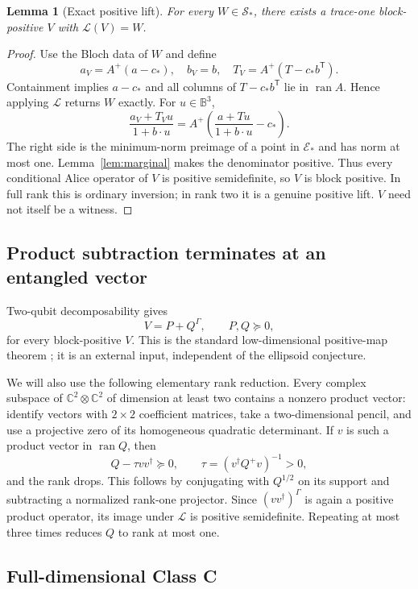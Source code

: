 \documentclass[11pt,a4paper]{article}
\newtheorem{lemma}[theorem]{Lemma}
\theoremstyle{definition}\newtheorem{definition}[theorem]{Definition}
\newcommand{\ran}{\operatorname{ran}}
\newcommand{\B}{\mathbb B^3}
\newcommand{\E}{\mathcal E}
\newcommand{\C}{\mathbb C}
\newcommand{\cstar}{c_*}
\newcommand{\Sstar}{\mathcal S_*}
\theoremstyle{plain}\newtheorem*{theorem*}{Theorem}
\begin{document}
\begin{lemma}[Exact positive lift]\label{lem:lift}
For every $W\in\Sstar$, there exists a trace-one block-positive $V$ with $\mathscr L(V)=W$.
\end{lemma}
\begin{proof}
Use the Bloch data of $W$ and define
\[
 a_V=A^+(a-\cstar),\quad b_V=b,\quad T_V=A^+(T-\cstar b^{\mathsf T}).
\]
Containment implies $a-\cstar$ and all columns of $T-\cstar b^{\mathsf T}$ lie in $\ran A$. Hence applying $\mathscr L$ returns $W$ exactly. For $u\in\B$,
\[
 \frac{a_V+T_Vu}{1+b\cdot u}=A^+\left(\frac{a+Tu}{1+b\cdot u}-\cstar\right).
\]
The right side is the minimum-norm preimage of a point in $\E_*$ and has norm at most one. Lemma~\ref{lem:marginal} makes the denominator positive. Thus every conditional Alice operator of $V$ is positive semidefinite, so $V$ is block positive. In full rank this is ordinary inversion; in rank two it is a genuine positive lift. $V$ need not itself be a witness.
\end{proof}

\subsection{Product subtraction terminates at an entangled vector}

Two-qubit decomposability gives
\begin{equation}\label{eq:decomp}
 V=P+Q^\Gamma,\qquad P,Q\succeq0,
\end{equation}
for every block-positive $V$. This is the standard low-dimensional positive-map theorem \cite{woronowicz}; it is an external input, independent of the ellipsoid conjecture.

We will also use the following elementary rank reduction. Every complex subspace of $\C^2\otimes\C^2$ of dimension at least two contains a nonzero product vector: identify vectors with $2\times2$ coefficient matrices, take a two-dimensional pencil, and use a projective zero of its homogeneous quadratic determinant. If $v$ is such a product vector in $\ran Q$, then
\[
 Q-\tau vv^\dagger\succeq0,
 \qquad \tau=(v^\dagger Q^+v)^{-1}>0,
\]
and the rank drops. This follows by conjugating with $Q^{1/2}$ on its support and subtracting a normalized rank-one projector. Since $(vv^\dagger)^\Gamma$ is again a positive product operator, its image under $\mathscr L$ is positive semidefinite. Repeating at most three times reduces $Q$ to rank at most one.

\subsection{Full-dimensional Class C}
\end{document}
